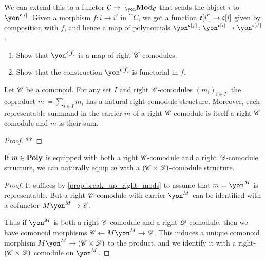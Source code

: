 \documentclass[Book-Poly]{subfiles}
\begin{document}
We can extend this to a functor $\cat{C} \to \bimod{\yon}{\cat{C}}$ that sends the object $i$ to $\yon^{\car{c}[i]}$. Given a morphism $f \colon i \to i'$ in $\cat{C}$, we get a function $\mathfrak{c}[i'] \to \mathfrak{c}[i]$ given by composition with $f$, and hence a map of polynomials $\yon^{\car{c}[f]} \colon \yon^{\car{c}[i]} \to \yon^{\car{c}[i']}$.

\begin{exercise}
\begin{enumerate}
    \item Show that $\yon^{\car{c}[f]}$ is a map of right $\mathscr{C}$-comodules.
    \item Show that the construction $\yon^{\car{c}[f]}$ is functorial in $f$. \qedhere
\end{enumerate}
\end{exercise}

\begin{proposition}\label{prop.break_up_right_mods}
Let $\mathscr{C}$ be a comonoid. For any set $I$ and right $\mathscr{C}$-comodules $(m_i)_{i\in I}$, the coproduct $m\coloneqq \sum_{i\in I}m_i$ has a natural right-comodule structure. Moreover, each representable summand in the carrier $m$ of a right $\mathscr{C}$-comodule is itself a right-$\mathscr{C}$ comodule and $m$ is their sum.
\end{proposition}
\begin{proof}
**
\end{proof}

\begin{proposition}
If $m\in\mathbf{Poly}$ is equipped with both a right $\mathscr{C}$-comodule and a right $\mathscr{D}$-comodule structure, we can naturally equip $m$ with a $(\mathscr{C}\times\mathscr{D})$-comodule structure.
\end{proposition}
\begin{proof}
It suffices by \cref{prop.break_up_right_mods} to assume that $m=\yon^M$ is representable. But a right $\mathscr{C}$-comodule with carrier $\yon^M$ can be identified with a cofunctor $M\yon^M\to\com{C}$.

Thus if $\yon^M$ is both a right-$\mathscr{C}$ comodule and a right-$\mathscr{D}$ comodule, then we have comonoid morphisms $\com{C}\from M\yon^M\to\com{D}$. This induces a unique comonoid morphism $M\yon^M\to(\com{C}\times\com{D})$ to the product, and we identify it with a right-$(\mathscr{C}\times\mathscr{D})$ comodule on $\yon^M$.
\end{proof}
\end{document}
